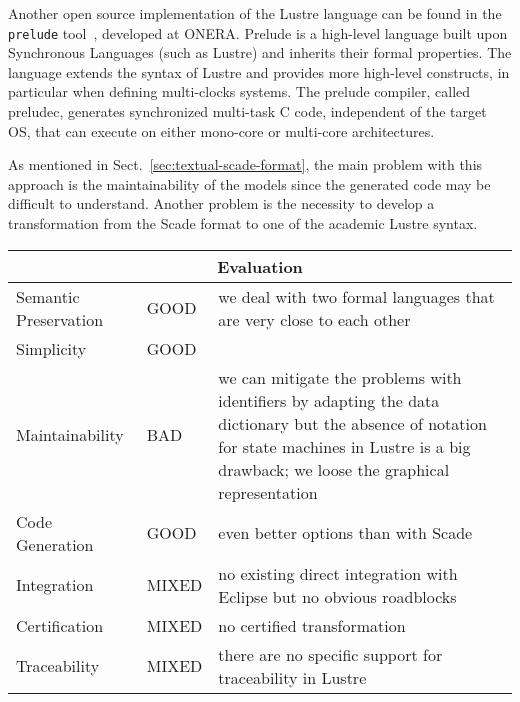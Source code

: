 \documentclass{template/openetcs_report}
\begin{document}
Another open source implementation of the Lustre language can be found
in the \verb+prelude+ tool~\cite{forget:hal-00688490}, developed at
ONERA. Prelude is a high-level language built upon Synchronous
Languages (such as Lustre) and inherits their formal properties. The
language extends the syntax of Lustre and provides more high-level
constructs, in particular when defining multi-clocks systems. The
prelude compiler, called preludec, generates synchronized multi-task C
code, independent of the target OS, that can execute on either
mono-core or multi-core architectures.

As mentioned in Sect.~\ref{sec:textual-scade-format}, the main problem
with this approach is the maintainability of the models since the
generated code may be difficult to understand. Another problem is the
necessity to develop a transformation from the Scade format to one of
the academic Lustre syntax.

\begin{tabular}[c]{|p{3.5cm}|p{1.2cm}|p{8.8cm}|}

  \hline
  \multicolumn{3}{|c|}{Evaluation} \\
  \hline

  Semantic Preservation & GOOD & we deal with two formal languages that are very close to
                                 each other \\

  \hline

  Simplicity &  GOOD & \\

  \hline

  Maintainability & BAD & we can mitigate the problems with identifiers
                          by adapting the data dictionary but the absence of
                          notation for state machines in Lustre is a
                          big drawback; we loose the graphical
                          representation\\

  \hline

  Code Generation & GOOD &  even better options than with Scade\\

  \hline

  Integration & MIXED & no existing direct integration with Eclipse but no
                        obvious roadblocks \\

  \hline

  Certification & MIXED & no certified transformation\\
  
  \hline
  
  Traceability & MIXED & there are no specific support for
                         traceability in Lustre\\
  
  \hline

\end{tabular}
\end{document}
